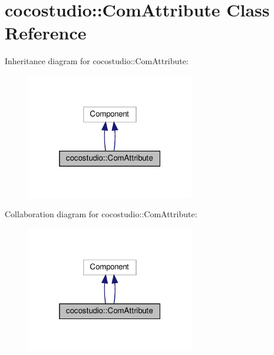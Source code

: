 \hypertarget{classcocostudio_1_1ComAttribute}{}\section{cocostudio\+:\+:Com\+Attribute Class Reference}
\label{classcocostudio_1_1ComAttribute}


Inheritance diagram for cocostudio\+:\+:Com\+Attribute\+:
\nopagebreak
\begin{figure}[H]
\begin{center}
\leavevmode
\includegraphics[width=208pt]{classcocostudio_1_1ComAttribute__inherit__graph}
\end{center}
\end{figure}


Collaboration diagram for cocostudio\+:\+:Com\+Attribute\+:
\nopagebreak
\begin{figure}[H]
\begin{center}
\leavevmode
\includegraphics[width=208pt]{classcocostudio_1_1ComAttribute__coll__graph}
\end{center}
\end{figure}
